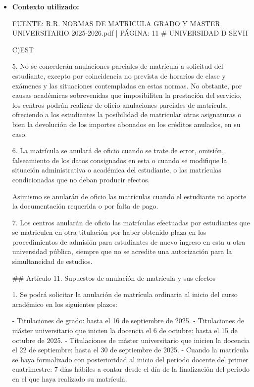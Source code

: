 \documentclass{article}
\begin{document}
\begin{itemize}
\begin{itemize}
                Recuerda que es importante seguir los pasos establecidos y presentar toda la documentación necesaria para evitar retrasos o problemas en el proceso de anulación de matrícula. Si tienes alguna duda, no dudes en consultar con la \textbf{Secretaría} del centro responsable del título oficial de los estudios donde formalizaste tu matrícula.
          \item \textbf{Contexto utilizado:}
                \begin{scriptsize}
                  FUENTE: R.R. NORMAS DE MATRICULA GRADO Y MASTER UNIVERSITARIO 2025-2026.pdf | PÁGINA: 11
                  \# UNIVERSIDAD D SEVII

                  C)EST

                  5. No se concederán anulaciones parciales de matrícula a solicitud del estudiante, excepto por coincidencia no prevista de horarios de clase y exámenes y las situaciones contempladas en estas normas. No obstante, por causas académicas sobrevenidas que imposibiliten la prestación del servicio, los centros podrán realizar de oficio anulaciones parciales de matrícula, ofreciendo a los estudiantes la posibilidad de matricular otras asignaturas o bien la devolución de los importes abonados en los créditos anulados, en su caso.

                  6. La matrícula se anulará de oficio cuando se trate de error, omisión, falseamiento de los datos consignados en esta o cuando se modifique la situación administrativa o académica del estudiante, o las matrículas condicionadas que no deban producir efectos.

                  Asimismo se anularán de oficio las matrículas cuando el estudiante no aporte la documentación requerida o por falta de pago.

                  7. Los centros anularán de oficio las matrículas efectuadas por estudiantes que se matriculen en otra titulación por haber obtenido plaza en los procedimientos de admisión para estudiantes de nuevo ingreso en esta u otra universidad pública, siempre que no se acredite una autorización para la simultaneidad de estudios.

                  \#\# Artículo 11. Supuestos de anulación de matrícula y sus efectos

                  1. Se podrá solicitar la anulación de matrícula ordinaria al inicio del curso académico en los siguientes plazos:

                  - Titulaciones de grado: hasta el 16 de septiembre de 2025.
                  - Titulaciones de máster universitario que inicien la docencia el 6 de octubre: hasta el 15 de octubre de 2025.
                  - Titulaciones de máster universitario que inicien la docencia el 22 de septiembre: hasta el 30 de septiembre de 2025.
                  - Cuando la matrícula se haya formalizado con posterioridad al inicio del periodo docente del primer cuatrimestre: 7 días hábiles a contar desde el día de la finalización del periodo en el que haya realizado su matrícula.


\end{scriptsize}
\end{itemize}
\end{itemize}
\end{document}
